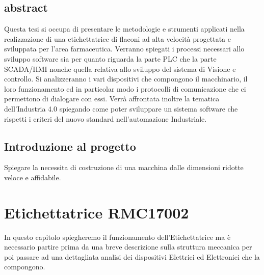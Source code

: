 \documentclass[12pt, a4paper, oneside]{book}
\begin{document}
\tableofcontents
{}

\newpage
\thispagestyle{empty}
\listoffigures

\newpage
\thispagestyle{empty}
\section*{abstract}
Questa tesi si occupa di presentare le metodologie e strumenti applicati nella realizzazione di una etichettatrice di flaconi ad alta velocità progettata e sviluppata per l'area farmaceutica.
Verranno spiegati i processi necessari allo sviluppo software sia per quanto riguarda la parte PLC che la parte SCADA/HMI nonche quella relativa allo sviluppo del sistema di Visione e controllo.
Si analizzeranno i vari dispositivi che compongono il macchinario, il loro funzionamento ed in particolar modo i protocolli di comunicazione che ci permettono di dialogare con essi. 
Verrà affrontata inoltre la tematica dell'Industria 4.0 spiegando come poter sviluppare un sistema software che rispetti i criteri del nuovo standard nell'automazione Industriale.
 

\newpage
\thispagestyle{empty}
\section*{Introduzione al progetto}
Spiegare la necessita di costruzione di una macchina dalle dimensioni ridotte veloce e affidabile. 

\chapter{Etichettatrice RMC17002}
In questo capitolo spiegheremo il funzionamento dell'Etichettatrice ma è necessario partire prima da una breve descrizione sulla struttura meccanica per poi passare ad una dettagliata analisi dei dispositivi Elettrici ed Elettronici che la compongono.
\end{document}
